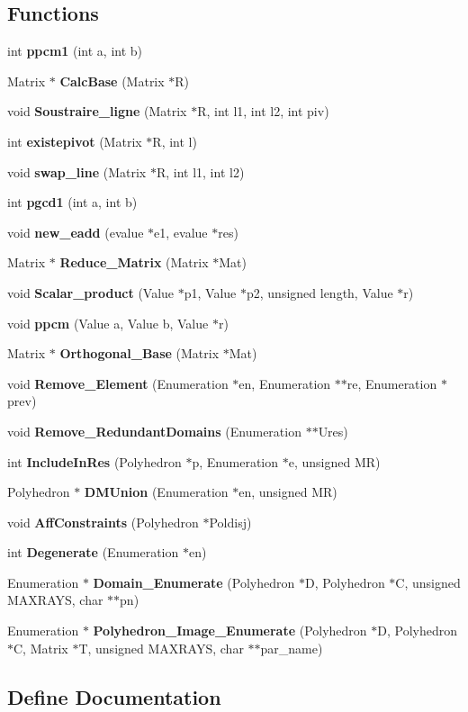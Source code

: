 \subsection*{Functions}
\begin{CompactItemize}
\item 
int {\bf ppcm1} (int a, int b)
\item 
Matrix $\ast$ {\bf Calc\-Base} (Matrix $\ast$R)
\item 
void {\bf Soustraire\_\-ligne} (Matrix $\ast$R, int l1, int l2, int piv)
\item 
int {\bf existepivot} (Matrix $\ast$R, int l)
\item 
void {\bf swap\_\-line} (Matrix $\ast$R, int l1, int l2)
\item 
int {\bf pgcd1} (int a, int b)
\item 
void {\bf new\_\-eadd} (evalue $\ast$e1, evalue $\ast$res)
\item 
Matrix $\ast$ {\bf Reduce\_\-Matrix} (Matrix $\ast$Mat)
\item 
void {\bf Scalar\_\-product} (Value $\ast$p1, Value $\ast$p2, unsigned length, Value $\ast$r)
\item 
void {\bf ppcm} (Value a, Value b, Value $\ast$r)
\item 
Matrix $\ast$ {\bf Orthogonal\_\-Base} (Matrix $\ast$Mat)
\item 
void {\bf Remove\_\-Element} (Enumeration $\ast$en, Enumeration $\ast$$\ast$re, Enumeration $\ast$prev)
\item 
void {\bf Remove\_\-Redundant\-Domains} (Enumeration $\ast$$\ast$Ures)
\item 
int {\bf Include\-In\-Res} (Polyhedron $\ast$p, Enumeration $\ast$e, unsigned MR)
\item 
Polyhedron $\ast$ {\bf DMUnion} (Enumeration $\ast$en, unsigned MR)
\item 
void {\bf Aff\-Constraints} (Polyhedron $\ast$Poldisj)
\item 
int {\bf Degenerate} (Enumeration $\ast$en)
\item 
Enumeration $\ast$ {\bf Domain\_\-Enumerate} (Polyhedron $\ast$D, Polyhedron $\ast$C, unsigned MAXRAYS, char $\ast$$\ast$pn)
\item 
Enumeration $\ast$ {\bf Polyhedron\_\-Image\_\-Enumerate} (Polyhedron $\ast$D, Polyhedron $\ast$C, Matrix $\ast$T, unsigned MAXRAYS, char $\ast$$\ast$par\_\-name)
\end{CompactItemize}


\subsection{Define Documentation}
